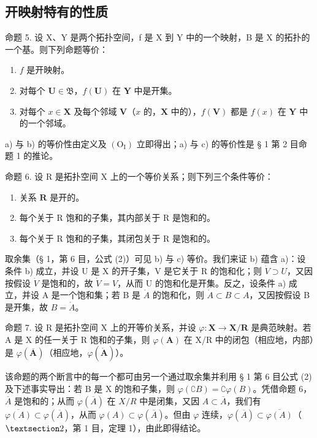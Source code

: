 \subsection{开映射特有的性质}

命题 5. 设 X、Y 是两个拓扑空间，f 是 X 到 Y 中的一个映射，B 是 X 的拓扑的一个基。则下列命题等价：

\begin{enumerate}
\def\labelenumi{\alph{enumi})}
\item
  \(f\) 是开映射。
\item
  对每个 \(\mathbf{U} \in \mathfrak{B}\)，\(f(\mathbf{U})\) 在 \(\mathbf{Y}\) 中是开集。
\item
  对每个 \(x \in \mathbf{X}\) 及每个邻域 \(\mathbf{V}\)（\(x\) 的，\(\mathbf{X}\) 中的），\(f(\mathbf{V})\) 都是 \(f(x)\) 在 \(\mathbf{Y}\) 中的一个邻域。
\end{enumerate}

a) 与 b) 的等价性由定义及 \((\mathrm{O}_{\mathrm{I}})\) 立即得出；a) 与 c) 的等价性是 § 1 第 2 目命题 1 的推论。

命题 6. 设 R 是拓扑空间 X 上的一个等价关系；则下列三个条件等价：

\begin{enumerate}
\def\labelenumi{\alph{enumi})}
\item
  关系 \(\mathbf{R}\) 是开的。
\item
  每个关于 R 饱和的子集，其内部关于 R 是饱和的。
\item
  每个关于 R 饱和的子集，其闭包关于 R 是饱和的。
\end{enumerate}

取余集（§ 1，第 6 目，公式 (2)）可见 b) 与 c) 等价。我们来证 b) 蕴含 a)：设条件 b) 成立，并设 U 是 X 的开子集，V 是它关于 R 的饱和化；则 \(\dot{V} \supset U\)，又因按假设 \(\dot{V}\) 是饱和的，故 \(\dot{V} = V\)，从而 U 的饱和化是开集。反之，设条件 a) 成立，并设 A 是一个饱和集；若 B 是 \(\mathring{A}\) 的饱和化，则 \(\mathring{A} \subset B \subset A\)，又因按假设 B 是开集，故 \(B = \mathring{A}\)。

命题 7. 设 R 是拓扑空间 X 上的开等价关系，并设 \(\varphi: \mathbf{X} \to \mathbf{X}/\mathbf{R}\) 是典范映射。若 A 是 X 的任一关于 R 饱和的子集，则 \(\varphi(\mathbf{A})\) 在 X/R 中的闭包（相应地，内部）是 \(\varphi(\overline{\mathbf{A}})\)（相应地，\(\varphi(\mathring{\mathbf{A}})\)）。

该命题的两个断言中的每一个都可由另一个通过取余集并利用 § 1 第 6 目公式 (2) 及下述事实导出：若 B 是 X 的饱和子集，则 \(\varphi(\complement B) = \complement \varphi(B)\)。凭借命题 6，\(\overline{A}\) 是饱和的；从而 \(\varphi(\overline{A})\) 在 \(X/R\) 中是闭集，又因 \(A \subset \overline{A}\)，我们有 \(\overline{\varphi(A)} \subset \varphi(\overline{A})\)，从而 \(\varphi(A) \subset \varphi(\overline{A})\)。但由 \(\varphi\) 连续，\(\varphi(\overline{A}) \subset \overline{\varphi(A)}\)（\(\S 2\)，第 1 目，定理 1），由此即得结论。

